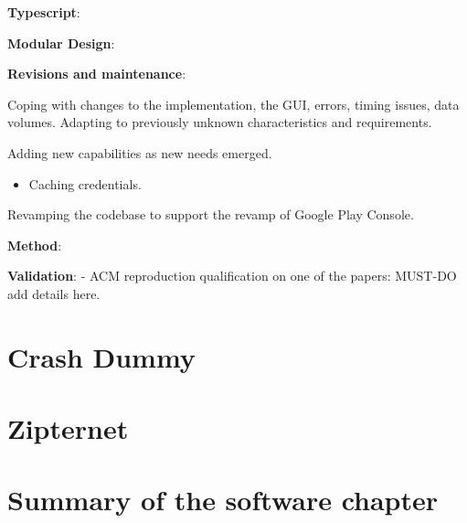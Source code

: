 \textbf{Typescript}:

\textbf{Modular Design}:

\textbf{Revisions and maintenance}:

Coping with changes to the implementation, the GUI, errors, timing issues, data volumes. Adapting to previously unknown characteristics and requirements. 

Adding new capabilities as new needs emerged.
\begin{itemize}
    \item Caching credentials. 
\end{itemize}

Revamping the codebase to support the revamp of Google Play Console.

\textbf{Method}:


\textbf{Validation}:
- ACM reproduction qualification on one of the papers: MUST-DO add details here. 

\section{Crash Dummy}


\section{Zipternet}


\section{Summary of the software chapter}